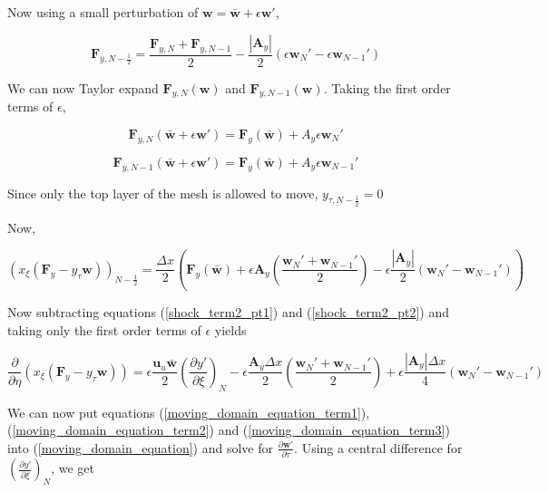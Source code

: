\documentclass[10pt]{article}
\begin{document}
	Now using a small perturbation of $\mathbf{w} = \bar{\mathbf{w}} + \epsilon \mathbf{w}'$, 
	
	$$ \mathbf{F}_{y,N-\frac{1}{2}} = \frac{\mathbf{F}_{y,N} + \mathbf{F}_{y,N-1}}{2} - \frac{|\mathbf{A}_y|}{2} (\epsilon \mathbf{w}_{N}' - \epsilon \mathbf{w}_{N-1}')$$
	
	We can now Taylor expand $\mathbf{F}_{y,N}(\mathbf{w})$ and $\mathbf{F}_{y,N-1}(\mathbf{w})$. Taking the first order terms of $\epsilon$,
	
	$$ \mathbf{F}_{y,N}(\bar{\mathbf{w}} + \epsilon \mathbf{w}') = \mathbf{F}_{y}(\bar{\mathbf{w}}) + A_y \epsilon \mathbf{w}_N' $$
	
	$$ \mathbf{F}_{y,N-1}(\bar{\mathbf{w}} + \epsilon \mathbf{w}') = \mathbf{F}_{y}(\bar{\mathbf{w}}) + A_y \epsilon \mathbf{w}_{N-1}' $$
	
	Since only the top layer of the mesh is allowed to move, $y_{\tau,N-\frac{1}{2}}=0$
	
	Now,
	
	\begin{equation} \label{shock_term2_pt2}
		(x_\xi (\mathbf{F}_y - y_\tau \mathbf{w}))_{N-\frac{1}{2}} = \frac{\Delta x}{2} \left( \mathbf{F}_{y}(\bar{\mathbf{w}}) + \epsilon \mathbf{A}_y \left( \frac{\mathbf{w}_N' + \mathbf{w}_{N-1}'}{2}\right) - \epsilon \frac{|\mathbf{A}_y|}{2} ( \mathbf{w}_N' - \mathbf{w}_{N-1}') \right)
	\end{equation}
	
	Now subtracting  equations (\ref{shock_term2_pt1}) and (\ref{shock_term2_pt2}) and taking only the first order terms of $\epsilon$ yields
	
	\begin{equation} \label{moving_domain_equation_term3}
		\frac{\partial}{\partial \eta} (x_\xi (\mathbf{F}_y - y_\tau \mathbf{w})) = 
		\epsilon \frac{\mathbf{u}_u \bar{\mathbf{w}}}{2} \left( \frac{\partial y'}{\partial \xi} \right)_N 
		- \epsilon \frac{\mathbf{A}_y \Delta x}{2} \left( \frac{\mathbf{w}_N' + \mathbf{w}_{N-1}'}{2} \right) 
		+ \epsilon \frac{|\mathbf{A}_y| \Delta x}{4} ( \mathbf{w}_N' - \mathbf{w}_{N-1}')
	\end{equation}
	
	We can now put equations (\ref{moving_domain_equation_term1}), (\ref{moving_domain_equation_term2}) and (\ref{moving_domain_equation_term3}) into (\ref{moving_domain_equation}) and solve for $\frac{\partial \mathbf{w}'}{\partial \tau}$. Using a central difference for $\left( \frac{\partial y'}{\partial \xi} \right)_N $, we get
		
\end{document}
